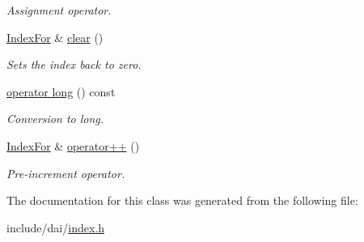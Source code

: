 \begin{CompactItemize}
\begin{CompactList}\small\item\em Assignment operator. \item\end{CompactList}\item 
\hypertarget{classdai_1_1IndexFor_4975cacce4ab1a7c0d2d873315016a40}{
\hyperlink{classdai_1_1IndexFor}{IndexFor} \& \hyperlink{classdai_1_1IndexFor_4975cacce4ab1a7c0d2d873315016a40}{clear} ()}
\label{classdai_1_1IndexFor_4975cacce4ab1a7c0d2d873315016a40}

\begin{CompactList}\small\item\em Sets the index back to zero. \item\end{CompactList}\item 
\hypertarget{classdai_1_1IndexFor_35fc3f06a034c2c80e0204e9516213ec}{
\hyperlink{classdai_1_1IndexFor_35fc3f06a034c2c80e0204e9516213ec}{operator long} () const }
\label{classdai_1_1IndexFor_35fc3f06a034c2c80e0204e9516213ec}

\begin{CompactList}\small\item\em Conversion to long. \item\end{CompactList}\item 
\hypertarget{classdai_1_1IndexFor_53798a077432c0653ed3fa8fc0340062}{
\hyperlink{classdai_1_1IndexFor}{IndexFor} \& \hyperlink{classdai_1_1IndexFor_53798a077432c0653ed3fa8fc0340062}{operator++} ()}
\label{classdai_1_1IndexFor_53798a077432c0653ed3fa8fc0340062}

\begin{CompactList}\small\item\em Pre-increment operator. \item\end{CompactList}\end{CompactItemize}


The documentation for this class was generated from the following file:\begin{CompactItemize}
\item 
include/dai/\hyperlink{index_8h}{index.h}\end{CompactItemize}
